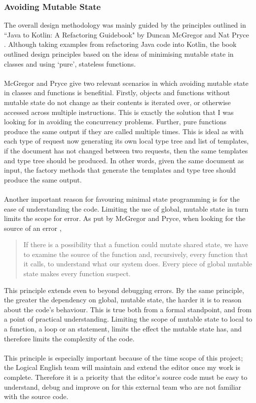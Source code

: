 \documentclass[../main.tex]{subfiles}
\begin{document}
\subsubsection{Avoiding Mutable State}
The overall design methodology was mainly guided by the principles outlined in ``Java to Kotlin: A Refactoring Guidebook" by Duncan McGregor and Nat Pryce \cite{java_to_kotlin_stateless}. Although taking examples from refactoring Java code into Kotlin, the book outlined design principles based on the ideas of minimising mutable state in classes and using `pure', stateless functions. 
\\
\\
McGregor and Pryce give two relevant scenarios in which avoiding mutable state in classes and functions is benefitial. Firstly, objects and functions without mutable state do not change as their contents is iterated over, or otherwise accessed across multiple instructions. \cite{java_to_kotlin_stateless} This is exactly the solution that I was looking for in avoiding the concurrency problems. Further, pure functions produce the same output if they are called multiple times\cite{java_to_kotlin_pure_functions}. This is ideal as with each type of request now generating its own local type tree and list of templates, if the document has not changed between two requests, then the same templates and type tree should be produced. In other words, given the same document as input, the factory methods that generate the templates and type tree should produce the same output.
\\
\\
Another important reason for favouring minimal state programming is for the ease of understanding the code. Limiting the use of global, mutable state in turn limits the scope for error. As put by McGregor and Pryce, when looking for the source of an error \cite{java_to_kotlin_error}, 
\begin{quote}
    If there is a possibility that a function could mutate shared state, we have to examine the source of the function and, recursively, every function that it calls, to understand what our system does. Every piece of global mutable state makes every function suspect.
\end{quote}
This principle extends even to beyond debugging errors. By the same principle, the greater the dependency on global, mutable state, the harder it is to reason about the code's behaviour. This is true both from a formal standpoint, and from a point of practical understanding. Limiting the scope of mutable state to local to a function, a  loop or an  statement, limits the effect the mutable state has, and therefore limits the complexity of the code.
\\
\\
This principle is especially important because of the time scope of this project; the Logical English team will maintain and extend the editor once my work is complete. Therefore it is a priority that the editor's source code must be easy to understand, debug and improve on for this external team who are not familiar with the source code.
\end{document}
